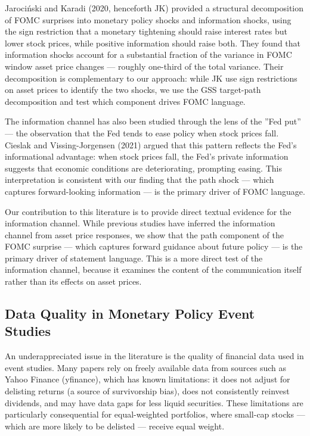 \documentclass[12pt]{article}
\begin{document}
Jarociński and Karadi (2020, henceforth JK) provided a structural decomposition of FOMC surprises into monetary policy shocks and information shocks, using the sign restriction that a monetary tightening should raise interest rates but lower stock prices, while positive information should raise both. They found that information shocks account for a substantial fraction of the variance in FOMC window asset price changes --- roughly one-third of the total variance. Their decomposition is complementary to our approach: while JK use sign restrictions on asset prices to identify the two shocks, we use the GSS target-path decomposition and test which component drives FOMC language.

The information channel has also been studied through the lens of the ''Fed put'' --- the observation that the Fed tends to ease policy when stock prices fall. Cieslak and Vissing-Jorgensen (2021) argued that this pattern reflects the Fed's informational advantage: when stock prices fall, the Fed's private information suggests that economic conditions are deteriorating, prompting easing. This interpretation is consistent with our finding that the path shock --- which captures forward-looking information --- is the primary driver of FOMC language.

Our contribution to this literature is to provide direct textual evidence for the information channel. While previous studies have inferred the information channel from asset price responses, we show that the path component of the FOMC surprise --- which captures forward guidance about future policy --- is the primary driver of statement language. This is a more direct test of the information channel, because it examines the content of the communication itself rather than its effects on asset prices.

\subsection{Data Quality in Monetary Policy Event Studies}

An underappreciated issue in the literature is the quality of financial data used in event studies. Many papers rely on freely available data from sources such as Yahoo Finance (yfinance), which has known limitations: it does not adjust for delisting returns (a source of survivorship bias), does not consistently reinvest dividends, and may have data gaps for less liquid securities. These limitations are particularly consequential for equal-weighted portfolios, where small-cap stocks --- which are more likely to be delisted --- receive equal weight.
\end{document}
